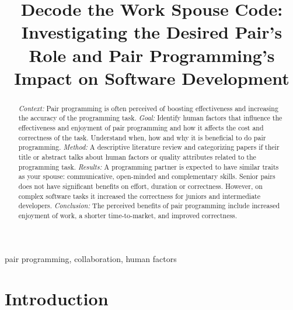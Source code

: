 \documentclass[conference]{IEEEtran}
\begin{document}
\title{Decode the Work Spouse Code: Investigating the Desired Pair's Role and Pair Programming's Impact on Software Development}


\author{
}

\maketitle

\begin{abstract}
\textit{Context:} Pair programming is often perceived of boosting effectiveness and increasing the accuracy of the programming task.
\textit{Goal:} Identify human factors that influence the effectiveness and enjoyment of pair programming and how it affects the cost and correctness of the task. Understand when, how and why it is beneficial to do pair programming.
\textit{Method:} A descriptive literature review and categorizing papers if their title or abstract talks about human factors or quality attributes related to the programming task.
\textit{Results:} A programming partner is expected to have similar traits as your spouse: communicative, open-minded and complementary skills. Senior pairs does not have significant benefits on effort, duration or correctness. However, on complex software tasks it increased the correctness for juniors and intermediate developers. 
\textit{Conclusion:} The perceived benefits of pair programming include increased enjoyment of work, a shorter time-to-market, and improved correctness.
\end{abstract}

\begin{IEEEkeywords}
pair programming, collaboration, human factors
\end{IEEEkeywords}

\section{Introduction}
\end{document}
